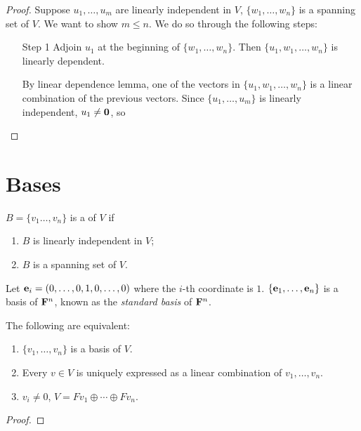 \begin{proof}
Suppose $u_1,\dots,u_m$ are linearly independent in $V$, $\{w_1,\dots,w_n\}$ is a spanning set of $V$. We want to show $m\le n$. We do so through the following steps:
\begin{itemize}
\item[Step 1] Adjoin $u_1$ at the beginning of $\{w_1,\dots,w_n\}$. Then $\{u_1,w_1,\dots,w_n\}$ is linearly dependent.

By linear dependence lemma, one of the vectors in $\{u_1,w_1,\dots,w_n\}$ is a linear combination of the previous vectors. Since $\{u_1,\dots,u_m\}$ is linearly independent, $u_1\neq\vb{0}$, so 
\end{itemize}
\end{proof}

\section{Bases}
\begin{definition}[Basis]\label{def:basis}
$B=\{v_1\dots,v_n\}$ is a  of $V$ if
\begin{enumerate}[label=(\roman*)]
\item $B$ is linearly independent in $V$;
\item $B$ is a spanning set of $V$.
\end{enumerate}
\end{definition}

\begin{example}
Let $\vb{e}_i=(0,\dots,0,1,0,\dots,0)$ where the $i$-th coordinate is $1$. $\{\vb{e}_1,\dots,\vb{e}_n\}$ is a basis of $\mathbf F^n$, known as the \emph{standard basis} of $\mathbf F^n$.
\end{example}

\begin{lemma}\label{lemma:basis-criterion}
The following are equivalent:
\begin{enumerate}[label=(\roman*)]
\item $\{v_1,\dots,v_n\}$ is a basis of $V$.
\item Every $v\in V$ is uniquely expressed as a linear combination of $v_1,\dots,v_n$.
\item $v_i\neq0$, $V=Fv_1\oplus\cdots\oplus Fv_n$.
\end{enumerate}
\end{lemma}

\begin{proof}

\end{proof}

